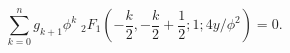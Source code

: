 \begin{equation}
\sum \limits_{k=0}^n g_{k+1} \phi^k \; _2 F_1 (-\frac{k}{2},-\frac{k}{2} + \frac{1}{2};1; 4 y/\phi^2) = 0 .
\label{critical_phi}
\end{equation}

